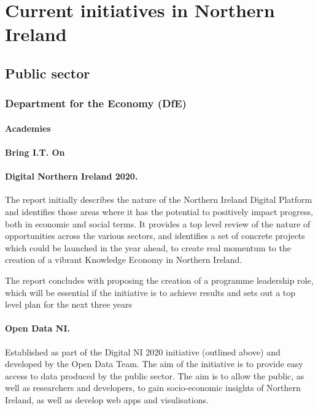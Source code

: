 \section{Current initiatives in Northern Ireland}

\subsection{Public sector}

\subsubsection{Department for the Economy (DfE)}

\paragraph{Academies}

\paragraph{Bring I.T. On}

\paragraph{Digital Northern Ireland 2020.}

The report initially describes the nature of the Northern Ireland Digital Platform and identifies those areas where it has the potential to positively impact progress, both in economic and social terms. It provides a top level review of the nature of opportunities across the various sectors, and identifies a set of concrete projects which could be launched in the year ahead, to create real momentum to the creation of a vibrant Knowledge Economy in Northern Ireland.

The report concludes with proposing the creation of a programme leadership role, which will be essential if the initiative is to achieve results and sets out a top level plan for the next three years

\paragraph{Open Data NI.}

Established as part of the Digital NI 2020 initiative (outlined above) and developed by the Open Data Team. The aim of the initiative is to provide easy access to data produced by the public sector. The aim is to allow the public, as well as researchers and developers, to gain socio-economic insights of Northern Ireland, as well as develop web apps and visulisations.

